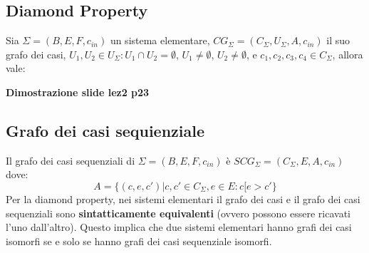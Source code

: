 \subsection{Diamond Property}
Sia $\Sigma = (B, E, F, c_{in})$ un sistema elementare, $CG_\Sigma = (C_\Sigma, U_\Sigma, A, c_{in})$ il suo grafo dei casi, $U_1, U_2 \in U_\Sigma : U_1 \cap U_2 = \emptyset$, $U_1 \neq \emptyset$, $U_2 \neq \emptyset$, e $c_1, c_2, c_3, c_4 \in C_\Sigma$, allora vale:
\begin{center}
\end{center}

\textbf{Dimostrazione slide lez2 p23}

\subsection{Grafo dei casi sequienziale}
Il grafo dei casi sequenziali di $\Sigma = (B, E, F, c_{in})$ è $SCG_\Sigma = (C_\Sigma, E, A, c_{in})$ dove:
\[
    A = \{ (c, e, c') | c, c' \in C_\Sigma, e \in E : c[e > c' \}
\]
\noindent
Per la diamond property, nei sistemi elementari il grafo dei casi e il grafo dei casi sequenziali sono \textbf{sintatticamente equivalenti} (ovvero possono essere ricavati l'uno dall'altro).
Questo implica che due sistemi elementari hanno grafi dei casi isomorfi se e solo se hanno grafi dei casi sequenziale isomorfi.

